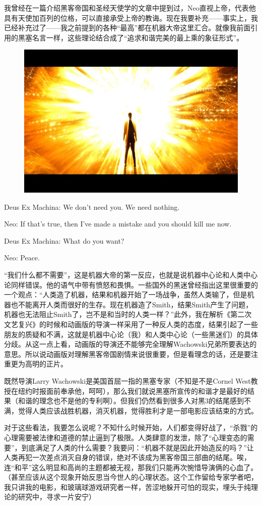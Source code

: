 \documentclass[UTF8]{ctexart}
\newenvironment{myquote}{\color{green} \setlength{\leftskip}{6em} \setlength{\rightskip}{4em} \setlength{\parindent}{-2em}}{\par}
\begin{document}
我曾经在一篇介绍黑客帝国和圣经天使学的文章中提到过，Neo直视上帝，代表他具有天使加百列的位格，可以直接承受上帝的教诲。现在我要补充——事实上，我已经补充过了——我之前提到的各种“最高”都在机器大帝这里汇合。就像我前面引用的黑塞名言一样，这些理论结合成了“追求和谐完美的最上乘的象征形式”。

\begin{figure}[htb]
\centering
\includegraphics[width=0.5\linewidth]{fig/2679b15192689319367abeb1.jpg}
\end{figure}

\begin{myquote}
Deus Ex Machina: We don't need you. We need nothing.

Neo: If that's true, then I've made a mistake and you should kill me now.

Deus Ex Machina: What do you want?

Neo: Peace.
\end{myquote}

“我们什么都不需要”，这是机器大帝的第一反应，也就是说机器中心论和人类中心论同样错误。他的语气中带有愤怒和畏惧。一些国外的黑迷曾经指出这里很重要的一个观点：“人类造了机器，结果和机器开始了一场战争，虽然人类输了，但是机器也不能离开人类而很好的生存。现在机器造了Smith，结果Smith产生了问题，机器也无法阻止Smith了，岂不是和当时的人类一样？”此外，我在解析《第二次文艺复兴》的时候和动画版的导演一样采用了一种反人类的态度，结果引起了一些朋友的质疑和不满，这就是机器中心论（我）和人类中心论（一些黑迷们）的具体分歧。从这一点上看，动画版的导演还不能够完全理解Wachowski兄弟所要表达的意思。所以说动画版对理解黑客帝国剧情来说很重要，但是看理念的话，还是要注重更为高明的正片。

既然导演Larry Wachowski是美国首屈一指的黑塞专家（不知是不是Cornel West教授在纽约时报面前奉承他，呵呵），那么我们就说黑塞所宣传的和谐才是最好的结果（和谐的理念也不是他的专利啊）。但我们仍然看到很多人对黑3的结尾感到不满，觉得人类应该战胜机器，消灭机器，觉得胜利才是一部电影应该结束的方式。

对于这些看法，我要怎么说呢？不知什么时候开始，人们都变得好战了，“杀戮”的心理需要被法律和道德的禁止逼到了极限。人类肆意的发泄，除了“心理变态的需要”，到底满足了人类的什么需要？我要问：“机器不就是因此开始造反的吗？”让人类再犯一次差点消灭自身的错误，绝对不该成为黑客帝国三部曲的结尾。唉，连“和平”这么明显和高尚的主题都被无视，那我们只能再次惋惜导演俩的心血了。（甚至应该从这个现象开始反思当今世人的心理状态。这个工作留给专家学者吧，我只讲我的电影，和玻璃球游戏研究者一样，苦涩地躲开可怕的现实，埋头于纯理论的研究中，寻求一片安宁）
\end{document}
